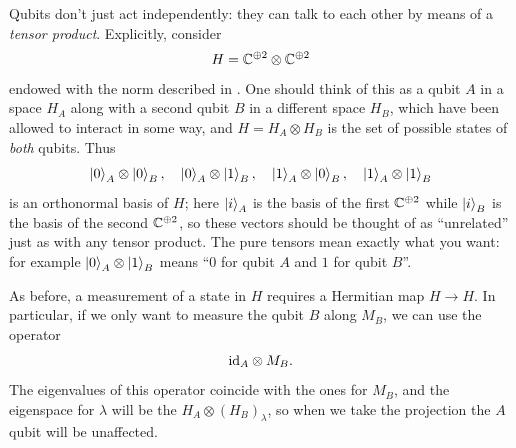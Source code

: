 Qubits don't just act independently:
they can talk to each other by means of a \emph{tensor product}.
Explicitly, consider \[ H = \mathbb C^{\oplus 2} \otimes \mathbb C^{\oplus 2} \]
endowed with the norm described in .
One should think of this as a qubit $A$ in a space $H_A$
along with a second qubit $B$ in a different space $H_B$,
which have been allowed to interact in some way,
and $H = H_A \otimes H_B$ is the set of possible states of \emph{both} qubits.
Thus
\[
	\ket{0}_A \otimes \ket{0}_B, \quad
	\ket{0}_A \otimes \ket{1}_B, \quad
	\ket{1}_A \otimes \ket{0}_B, \quad
	\ket{1}_A \otimes \ket{1}_B
\]
is an orthonormal basis of $H$;
here $\ket{i}_A$ is the basis of the first $\mathbb C^{\oplus 2}$
while $\ket{i}_B$ is the basis of the second $\mathbb C^{\oplus 2}$,
so these vectors should be thought of as ``unrelated''
just as with any tensor product.
The pure tensors mean exactly what you want:
for example $\ket0_A \otimes \ket1_B$ means
``$0$ for qubit $A$ and $1$ for qubit $B$''.

As before, a measurement of a state in $H$ requires
a Hermitian map $H \to H$.
In particular, if we only want to measure the qubit $B$ along $M_B$,
we can use the operator \[ \mathrm{id}_A \otimes M_B. \]
The eigenvalues of this operator coincide with the ones for $M_B$,
and the eigenspace for $\lambda$ will be the $H_A \otimes (H_B)_\lambda$,
so when we take the projection the $A$ qubit will be unaffected.

